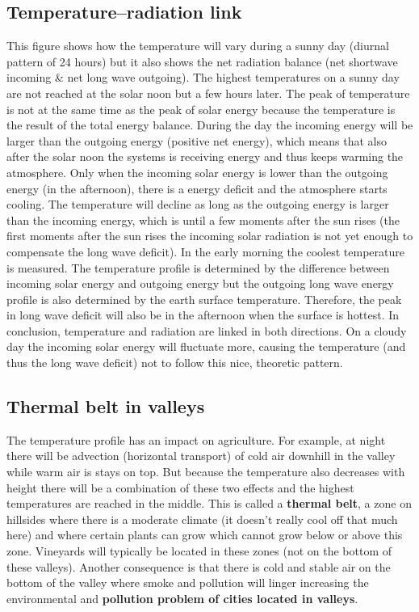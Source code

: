 \documentclass[oneside]{book}
\begin{document}
\subsection{Temperature--radiation
link}\label{temperatureradiation-link}

This figure shows how the temperature will vary during a sunny day
(diurnal pattern of 24 hours) but it also shows the net radiation
balance (net shortwave incoming \& net long wave outgoing). The highest
temperatures on a sunny day are not reached at the solar noon but a few
hours later. The peak of temperature is not at the same time as the peak
of solar energy because the temperature is the result of the total
energy balance. During the day the incoming energy will be larger than
the outgoing energy (positive net energy), which means that also after
the solar noon the systems is receiving energy and thus keeps warming
the atmosphere. Only when the incoming solar energy is lower than the
outgoing energy (in the afternoon), there is a energy deficit and the
atmosphere starts cooling. The temperature will decline as long as the
outgoing energy is larger than the incoming energy, which is until a few
moments after the sun rises (the first moments after the sun rises the
incoming solar radiation is not yet enough to compensate the long wave
deficit). In the early morning the coolest temperature is measured. The
temperature profile is determined by the difference between incoming
solar energy and outgoing energy but the outgoing long wave energy
profile is also determined by the earth surface temperature. Therefore,
the peak in long wave deficit will also be in the afternoon when the
surface is hottest. In conclusion, temperature and radiation are linked
in both directions. On a cloudy day the incoming solar energy will
fluctuate more, causing the temperature (and thus the long wave deficit)
not to follow this nice, theoretic pattern.

\subsection{Thermal belt in valleys}\label{thermal-belt-in-valleys}

The temperature profile has an impact on agriculture. For example, at
night there will be advection (horizontal transport) of cold air
downhill in the valley while warm air is stays on top. But because the
temperature also decreases with height there will be a combination of
these two effects and the highest temperatures are reached in the
middle. This is called a \textbf{thermal belt}, a zone on hillsides
where there is a moderate climate (it doesn't really cool off that much
here) and where certain plants can grow which cannot grow below or above
this zone. Vineyards will typically be located in these zones (not on
the bottom of these valleys). Another consequence is that there is cold
and stable air on the bottom of the valley where smoke and pollution
will linger increasing the environmental and \textbf{pollution problem
of cities located in valleys}.
\end{document}
